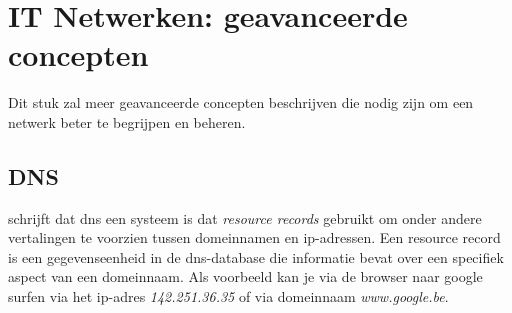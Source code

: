 \section{IT Netwerken: geavanceerde concepten}
Dit stuk zal meer geavanceerde concepten beschrijven die nodig zijn om een netwerk beter te begrijpen en beheren.

\subsection{DNS}
\textcite{Mockapetris1987} schrijft dat \acrshort{dns} een systeem is dat \textit{resource records} gebruikt om onder andere vertalingen te voorzien tussen domeinnamen en \acrshort{ip}-adressen. Een resource record is een gegevenseenheid in de \acrshort{dns}-database die informatie bevat over een specifiek aspect van een domeinnaam. Als voorbeeld kan je via de browser naar google surfen via het \acrshort{ip}-adres \textit{142.251.36.35} of via domeinnaam \textit{www.google.be}. 

